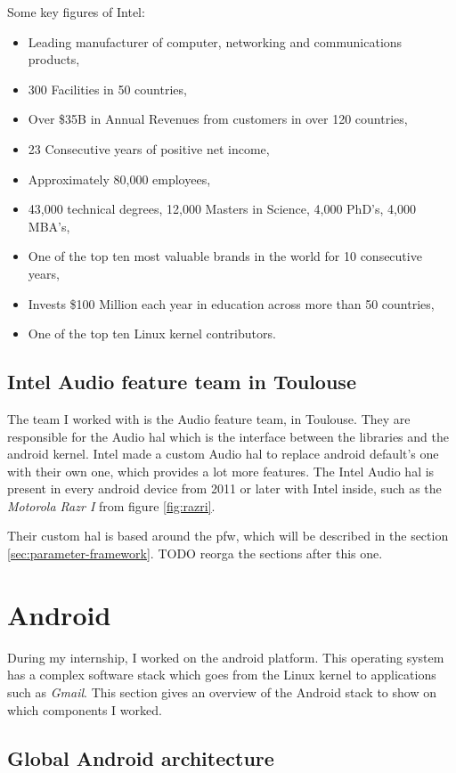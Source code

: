 Some key figures of Intel:
\begin{itemize}
\item Leading manufacturer of computer, networking and communications
  products,
  \item 300 Facilities in 50 countries,
  \item Over \$35B in Annual Revenues from customers in over 120
    countries,
\item 23 Consecutive years of positive net income,
\item Approximately 80,000 employees,
\item 43,000 technical degrees, 12,000 Masters in Science, 4,000
  PhD’s, 4,000 MBA’s,
  \item One of the top ten most valuable brands in the world for 10
    consecutive years,
\item Invests \$100 Million each year in education across more than 50
  countries,
\item One of the top ten Linux \gls{kernel} contributors.
\end{itemize}


\subsection{Intel Audio feature team in Toulouse}
The team I worked with is the Audio feature team, in Toulouse.
They are responsible for the Audio \gls{hal} which is the interface between the
libraries and the \gls{android} \gls{kernel}. Intel made a custom Audio \gls{hal} to
replace \gls{android} default's one with their own one, which provides a lot more features.
The Intel Audio \gls{hal} is present in every \gls{android} device from 2011 or later with Intel inside, such
as the \emph{Motorola Razr I} from figure \ref{fig:razri}.

Their custom \gls{hal} is based around the \gls{pfw}, which will be described in the section \ref{sec:parameter-framework}.
TODO reorga the sections after this one.

\section{Android}
During my internship, I worked on the \gls{android} platform. This operating
system has a complex software stack which goes from the Linux \gls{kernel} to
applications such as \emph{Gmail}. This section gives an overview of the Android
stack to show on which components I worked.

\subsection{Global Android architecture}


